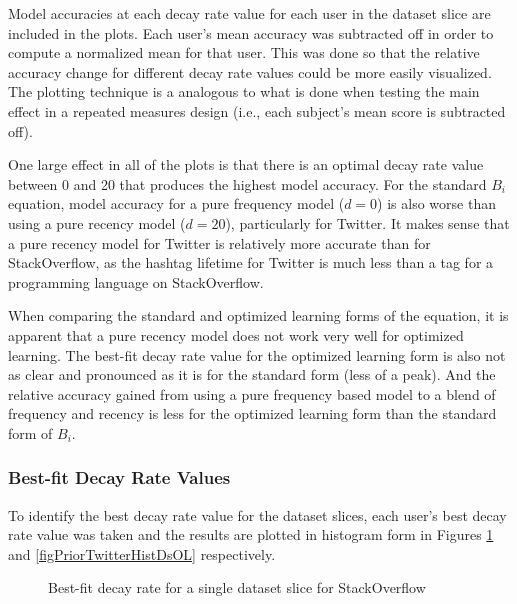 \documentclass[man,floatsintext,donotrepeattitle]{apa6}
\begin{document}
Model accuracies at each decay rate value for each user in the dataset slice are included in the plots.
Each user's mean accuracy was subtracted off in order to compute a normalized mean for that user.
This was done so that the relative accuracy change for different decay rate values could be more easily visualized.
The plotting technique is a analogous to what is done when testing the main effect in a repeated measures design (i.e., each subject's mean score is subtracted off).

One large effect in all of the plots is that there is an optimal decay rate value between 0 and 20 that produces the highest model accuracy.
For the standard $B_{i}$ equation, model accuracy for a pure frequency model ($d=0$) is also worse than using a pure recency model ($d=20$), particularly for Twitter.
It makes sense that a pure recency model for Twitter is relatively more accurate than for StackOverflow, as the hashtag lifetime for Twitter is much less than a tag for a programming language on StackOverflow.

When comparing the standard and optimized learning forms of the equation, it is apparent that a pure recency model does not work very well for optimized learning.
The best-fit decay rate value for the optimized learning form is also not as clear and pronounced as it is for the standard form (less of a peak).
And the relative accuracy gained from using a pure frequency based model to a blend of frequency and recency is less for the optimized learning form than the standard form of $B_{i}$.

\subsubsection{Best-fit Decay Rate Values}

To identify the best decay rate value for the dataset slices,
each user's best decay rate value was taken and the results are plotted in histogram form in Figures \ref{figPriorSOQHistDsOL} and \ref{figPriorTwitterHistDsOL} respectively.

\begin{figure}[!htbp]
  {%
    \setlength{\fboxsep}{0pt}%
    \setlength{\fboxrule}{1pt}%
    \hfill
    \hfill
    \caption{Best-fit decay rate for a single dataset slice for StackOverflow}
    \label{figPriorSOQHistDsOL}
  }%
\end{figure}
\end{document}
